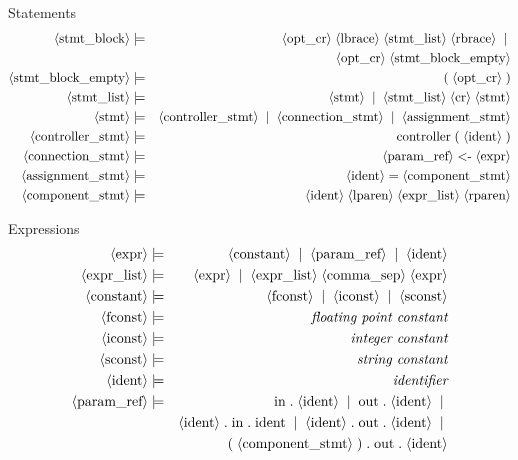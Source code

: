 Statements
\begin{eqnarray*}
  \pn{stmt{\textunderscore}block} &\pp&
    \pn{opt{\textunderscore}cr} \ww
    \pn{lbrace} \ww
    \pn{stmt{\textunderscore}list} \ww
    \pn{rbrace} \oo \\
    & & \pn{opt{\textunderscore}cr} \ww
    \pn{stmt{\textunderscore}block{\textunderscore}empty} \\
  \pn{stmt{\textunderscore}block{\textunderscore}empty} &\pp&
    \sm{(} \ww
    \pn{opt{\textunderscore}cr} \ww
    \sm{)} \\
  \pn{stmt{\textunderscore}list} &\pp&
    \pn{stmt} \oo
    \pn{stmt{\textunderscore}list} \ww
    \pn{cr} \ww
    \pn{stmt} \\
  \pn{stmt} &\pp&
    \pn{controller{\textunderscore}stmt} \oo
    \pn{connection{\textunderscore}stmt} \oo
    \pn{assignment{\textunderscore}stmt} \\
  \pn{controller{\textunderscore}stmt} &\pp&
    \sm{controller} \ww
    \sm{(} \ww
    \pn{ident} \ww
    \sm{)} \\
  \pn{connection{\textunderscore}stmt} &\pp&
    \pn{param{\textunderscore}ref} \ww
    \sm{<-} \ww
    \pn{expr} \\
  \pn{assignment{\textunderscore}stmt} &\pp&
    \pn{ident} \ww
    \sm{=} \ww
    \pn{component{\textunderscore}stmt} \\
  \pn{component{\textunderscore}stmt} &\pp&
    \pn{ident} \ww
    \pn{lparen} \ww
    \pn{expr{\textunderscore}list} \ww
    \pn{rparen} \\
\end{eqnarray*}

Expressions
\begin{eqnarray*}
  \pn{expr} &\pp&
    \pn{constant} \oo
    \pn{param{\textunderscore}ref} \oo
    \pn{ident} \\
  \pn{expr{\textunderscore}list} &\pp&
    \pn{expr} \oo
    \pn{expr{\textunderscore}list} \ww
    \pn{comma{\textunderscore}sep} \ww
    \pn{expr} \\
  \pn{constant} &\pp&
    \pn{fconst} \oo
    \pn{iconst} \oo
    \pn{sconst} \\
  \pn{fconst} &\pp&
    \sd{floating point constant} \\
  \pn{iconst} &\pp&
    \sd{integer constant} \\
  \pn{sconst} &\pp&
    \sd{string constant} \\
  \pn{ident} &\pp&
    \sd{identifier} \\
  \pn{param{\textunderscore}ref} &\pp&
    \sm{in} \ww
    \sm{.} \ww
    \pn{ident} \oo
    \sm{out} \ww
    \sm{.} \ww
    \pn{ident} \oo \\
    & & \pn{ident} \ww
    \sm{.} \ww
    \sm{in} \ww
    \sm{.} \ww
    \sm{ident} \oo
    \pn{ident} \ww
    \sm{.} \ww
    \sm{out} \ww
    \sm{.} \ww
    \pn{ident} \oo \\
    & & \sm{(} \ww
    \pn{component{\textunderscore}stmt} \ww
    \sm{)} \ww
    \sm{.} \ww
    \sm{out} \ww
    \sm{.} \ww
    \pn{ident} \\
\end{eqnarray*}

